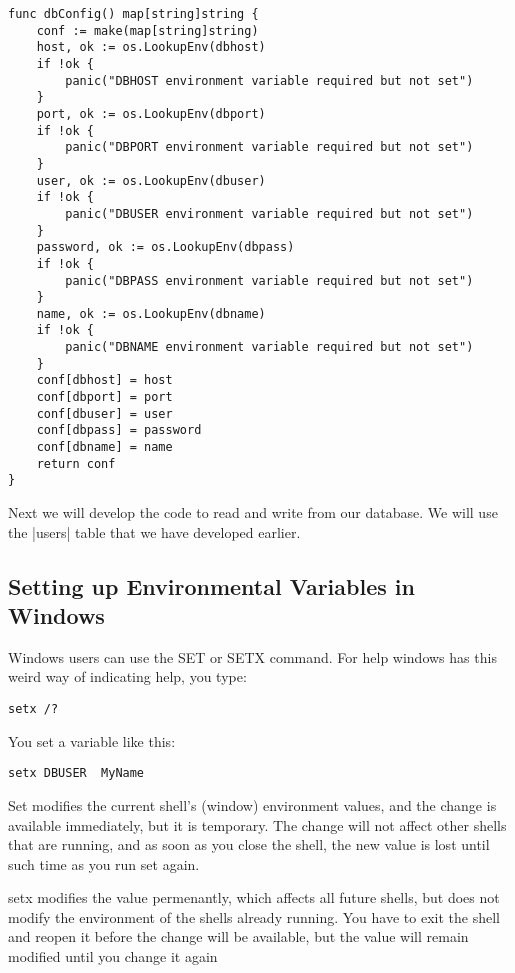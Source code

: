 \begin{verbatim}
func dbConfig() map[string]string {
    conf := make(map[string]string)
    host, ok := os.LookupEnv(dbhost)
    if !ok {
        panic("DBHOST environment variable required but not set")
    }
    port, ok := os.LookupEnv(dbport)
    if !ok {
        panic("DBPORT environment variable required but not set")
    }
    user, ok := os.LookupEnv(dbuser)
    if !ok {
        panic("DBUSER environment variable required but not set")
    }
    password, ok := os.LookupEnv(dbpass)
    if !ok {
        panic("DBPASS environment variable required but not set")
    }
    name, ok := os.LookupEnv(dbname)
    if !ok {
        panic("DBNAME environment variable required but not set")
    }
    conf[dbhost] = host
    conf[dbport] = port
    conf[dbuser] = user
    conf[dbpass] = password
    conf[dbname] = name
    return conf
}
\end{verbatim}


Next we will develop the code to read and write from our database. We will use the |users| table that we have developed earlier. 


\subsection{Setting up Environmental Variables in Windows}

Windows users can use the SET or SETX command. For help windows has this weird way of indicating help, you type:

\begin{verbatim}
setx /?
\end{verbatim}

You set a variable like this:

\begin{verbatim}
setx DBUSER  MyName
\end{verbatim}

Set modifies the current shell's (window) environment values, and the change is available immediately, but it is temporary. The change will not affect other shells that are running, and as soon as you close the shell, the new value is lost until such time as you run set again.

setx modifies the value permenantly, which affects all future shells, but does not modify the environment of the shells already running. You have to exit the shell and reopen it before the change will be available, but the value will remain modified until you change it again



